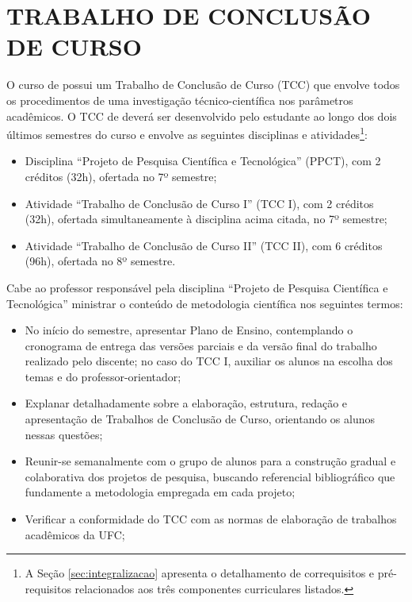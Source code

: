 \chapter{TRABALHO DE CONCLUSÃO DE CURSO}
\label{cap:trabalho-de-conclusao-de-curso}

O curso de \nomedocurso possui um Trabalho de Conclusão de Curso (TCC) que envolve todos os procedimentos de uma investigação técnico-científica nos parâmetros acadêmicos. O TCC de \nomedocurso deverá ser desenvolvido pelo estudante ao longo dos dois últimos semestres do curso e envolve as seguintes disciplinas e atividades\footnote{A Seção \ref{sec:integralizacao} apresenta o detalhamento de correquisitos e pré-requisitos relacionados aos três componentes curriculares listados.}:
\begin{itemize}
    \item Disciplina ``Projeto de Pesquisa Científica e Tecnológica'' (PPCT), com 2 créditos (32h), ofertada no 7º semestre;
    \item Atividade ``Trabalho de Conclusão de Curso I'' (TCC I), com 2 créditos (32h), ofertada simultaneamente à disciplina acima citada, no 7º semestre;
    \item Atividade ``Trabalho de Conclusão de Curso II'' (TCC II), com 6 créditos (96h), ofertada no 8º semestre.
\end{itemize}



Cabe ao professor responsável pela disciplina ``Projeto de Pesquisa Científica e Tecnológica'' ministrar o conteúdo de metodologia científica nos seguintes termos:
\begin{itemize}
    \item No início do semestre, apresentar Plano de Ensino, contemplando o cronograma de entrega das versões parciais e da versão final do trabalho realizado pelo discente; no caso do TCC I, auxiliar os alunos na escolha dos temas e do professor-orientador;

    \item Explanar detalhadamente sobre a elaboração, estrutura, redação e apresentação de Trabalhos de Conclusão de Curso, orientando os alunos nessas questões;
    
    \item Reunir-se semanalmente com o grupo de alunos para a construção gradual e colaborativa dos projetos de pesquisa, buscando referencial bibliográfico que fundamente a metodologia empregada em cada projeto;

    \item Verificar a conformidade do TCC com as normas de elaboração de trabalhos acadêmicos da UFC;
    


\end{itemize}

